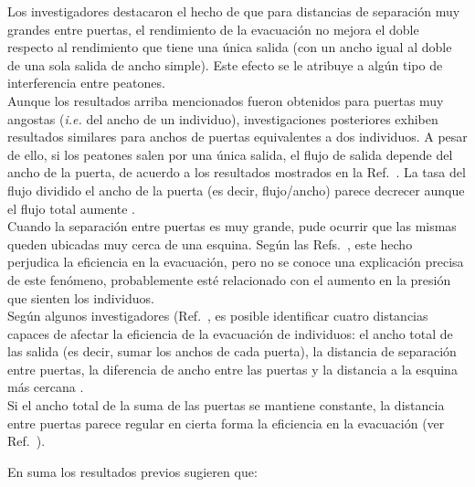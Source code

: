 \noindent Los investigadores destacaron el hecho de que para distancias de separación muy grandes entre puertas, el rendimiento de la evacuación no mejora el doble respecto al rendimiento que tiene una única salida (con un ancho igual al doble de una sola salida de ancho simple). Este efecto se le atribuye a algún tipo de interferencia entre peatones\cite{perez1}.\\

\noindent Aunque los resultados arriba mencionados fueron obtenidos para puertas muy angostas (\emph{i.e.} del ancho de un individuo),
investigaciones posteriores exhiben resultados similares para anchos de puertas equivalentes a dos individuos. A pesar de ello, si los peatones salen por una única salida, el flujo de salida depende del ancho de la puerta, de acuerdo a los resultados mostrados en la Ref.~\cite{daoliang1}. La tasa del flujo dividido el ancho de la puerta (es decir, flujo/ancho) parece decrecer aunque el flujo total aumente \cite{daoliang1}.\\
 
Cuando la separación entre puertas es muy grande, pude ocurrir que las mismas queden ubicadas muy cerca de una esquina. Según las 
Refs.~\cite{kirchner1,daoliang1}, este hecho perjudica la eficiencia 
en la evacuación, pero no se conoce una explicación precisa de este 
fenómeno, probablemente esté relacionado con el aumento en la presión que sienten los individuos. \\

\noindent Según algunos investigadores (Ref.~\cite{huanhuan1}, es posible identificar cuatro distancias capaces de afectar la eficiencia de la evacuación de individuos: el ancho total de las salida (es decir, sumar los anchos de cada puerta), la distancia de separación entre puertas, la diferencia de ancho entre las puertas y la distancia a la esquina más cercana \cite{huanhuan1}. \\

Si el ancho total de la suma de las puertas se mantiene constante, la distancia entre puertas parece regular en cierta forma la eficiencia en la evacuación (ver Ref.~\cite{huanhuan1}).


En suma los resultados previos sugieren que:

